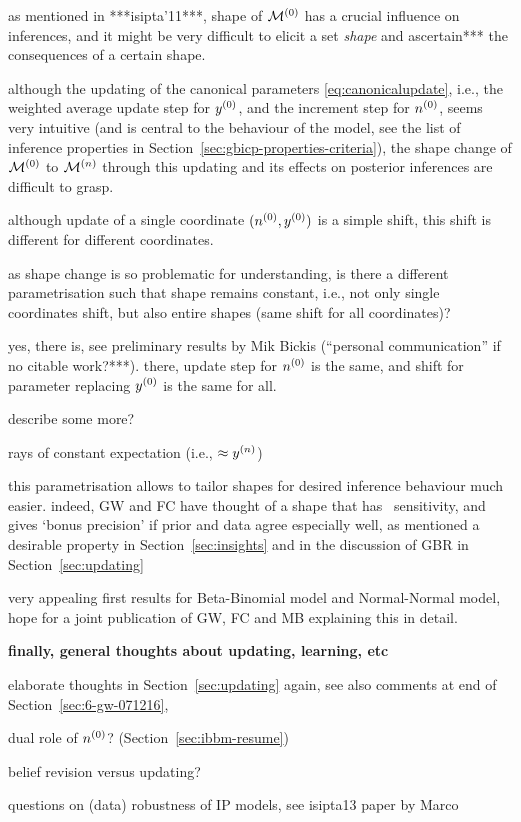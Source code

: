 as mentioned in ***isipta'11***, shape of $\mathcal{M}^{(0)}$ has a crucial influence on inferences,
and it might be very difficult to elicit a set \emph{shape} and ascertain*** the consequences of a certain shape.

although the updating of the canonical parameters \eqref{eq:canonicalupdate},
i.e., the weighted average update step for $y^{(0)}$, and the increment step for $n^{(0)}$,
seems very intuitive (and is central to the behaviour of the model,
see the list of inference properties in Section~\ref{sec:gbicp-properties-criteria}),
the shape change of $\mathcal{M}^{(0)}$ to $\mathcal{M}^{(n)}$ through this updating and its effects on posterior inferences are difficult to grasp.

although update of a single coordinate $(n^{(0)},y^{(0)})$ is a simple shift,
this shift is different for different coordinates.

as shape change is so problematic for understanding,
is there a different parametrisation such that shape remains constant,
i.e., not only single coordinates shift, but also entire shapes
(same shift for all coordinates)?

yes, there is, see preliminary results by Mik Bickis (``personal communication'' if no citable work?***).
there, update step for $n^{(0)}$ is the same, and shift for parameter replacing $y^{(0)}$ is the same for all. 

describe some more?

rays of constant expectation (i.e., $\approx y^{(n)}$)

this parametrisation allows to tailor shapes for desired inference behaviour much easier.
indeed, GW and FC have thought of a shape that has \pdc\ sensitivity,
and gives `bonus precision' if prior and data agree especially well,
as mentioned a desirable property in Section~\ref{sec:insights}
and in the discussion of GBR in Section~\ref{sec:updating}

very appealing first results for Beta-Binomial model and Normal-Normal model,
hope for a joint publication of GW, FC and MB explaining this in detail.


\textbf{finally, general thoughts about updating, learning, etc}

elaborate thoughts in Section~\ref{sec:updating} again,
see also comments at end of Section~\ref{sec:6-gw-071216},

dual role of $n^{(0)}$? (Section~\ref{sec:ibbm-resume})

belief revision versus updating?

questions on (data) robustness of IP models, see isipta13 paper by Marco


